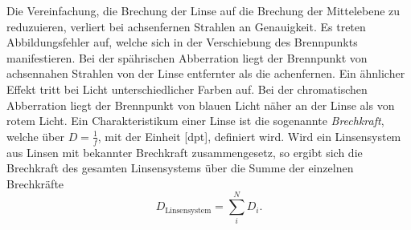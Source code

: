 Die Vereinfachung, die Brechung der Linse auf die Brechung der Mittelebene zu reduzuieren, verliert bei achsenfernen Strahlen an Genauigkeit. Es treten Abbildungsfehler auf, welche sich in der Verschiebung des Brennpunkts manifestieren. Bei der spährischen Abberration liegt der Brennpunkt von achsennahen Strahlen von der Linse entfernter als die achenfernen. Ein ähnlicher Effekt tritt bei Licht unterschiedlicher Farben auf. Bei der chromatischen Abberration liegt der Brennpunkt von blauen Licht näher an der Linse als von rotem Licht. 
Ein Charakteristikum einer Linse ist die sogenannte \textit{Brechkraft}, welche über $D=\frac{1}{f}$, mit der Einheit [dpt], definiert wird. 
Wird ein Linsensystem aus Linsen mit bekannter Brechkraft zusammengesetz, so ergibt sich die Brechkraft des gesamten Linsensystems über die Summe der einzelnen Brechkräfte
\begin{equation}
    D_\text{Linsensystem}=\sum_i^N D_i .
\end{equation}








